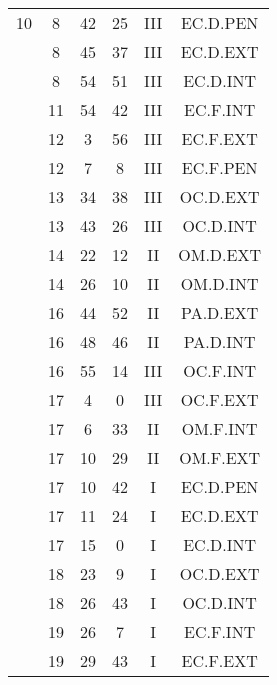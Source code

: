 \documentclass[12pt, a4paper]{article}
\begin{document}
\begin{multicols}{3}
{\begin{tabular}{c c c c c c}
	 	 	 	10 & 8 & 42 & 25 & III & EC.D.PEN\\%
	 	 	 	 & 8 & 45 & 37 & III & EC.D.EXT\\%
	 	 	 	 & 8 & 54 & 51 & III & EC.D.INT\\%
	 	 	 	 & 11 & 54 & 42 & III & EC.F.INT\\%
	 	 	 	 & 12 & 3 & 56 & III & EC.F.EXT\\%
	 	 	 	 & 12 & 7 & 8 & III & EC.F.PEN\\%
	 	 	 	 & 13 & 34 & 38 & III & OC.D.EXT\\%
	 	 	 	 & 13 & 43 & 26 & III & OC.D.INT\\%
	 	 	 	 & 14 & 22 & 12 & II & OM.D.EXT\\%
	 	 	 	 & 14 & 26 & 10 & II & OM.D.INT\\%
	 	 	 	 & 16 & 44 & 52 & II & PA.D.EXT\\%
	 	 	 	 & 16 & 48 & 46 & II & PA.D.INT\\%
	 	 	 	 & 16 & 55 & 14 & III & OC.F.INT\\%
	 	 	 	 & 17 & 4 & 0 & III & OC.F.EXT\\%
	 	 	 	 & 17 & 6 & 33 & II & OM.F.INT\\%
	 	 	 	 & 17 & 10 & 29 & II & OM.F.EXT\\%
	 	 	 	 & 17 & 10 & 42 & I & EC.D.PEN\\%
	 	 	 	 & 17 & 11 & 24 & I & EC.D.EXT\\%
	 	 	 	 & 17 & 15 & 0 & I & EC.D.INT\\%
	 	 	 	 & 18 & 23 & 9 & I & OC.D.EXT\\%
	 	 	 	 & 18 & 26 & 43 & I & OC.D.INT\\%
	 	 	 	 & 19 & 26 & 7 & I & EC.F.INT\\%
	 	 	 	 & 19 & 29 & 43 & I & EC.F.EXT\\%

\end{tabular}}
\end{multicols}
\end{document}

